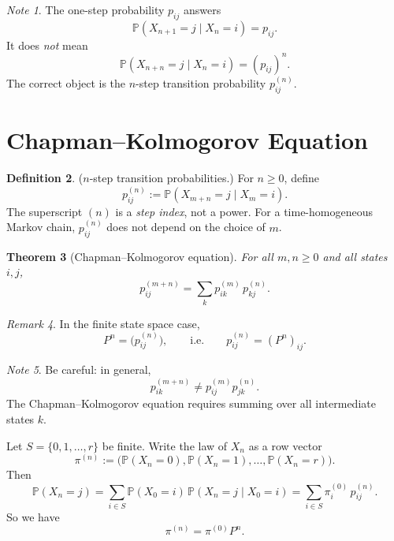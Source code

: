 \documentclass[11pt]{article}
\theoremstyle{plain}
\newtheorem{theorem}{Theorem}[section]
\theoremstyle{definition}
\newtheorem{definition}[theorem]{Definition}
\theoremstyle{remark}
\newtheorem{remark}[theorem]{Remark}
\newtheorem{note}[theorem]{Note}
\begin{document}
	\begin{note}
		The one-step probability \(p_{ij}\) answers
		\[
		\mathbb{P}(X_{n+1}=j\mid X_n=i)=p_{ij}.
		\]
		It does \emph{not} mean
		\[
		\mathbb{P}(X_{n+n}=j\mid X_n=i)=(p_{ij})^n.
		\]
		The correct object is the \(n\)-step transition probability \(p_{ij}^{(n)}\).
	\end{note}
	
	\section{Chapman--Kolmogorov Equation}
	
	\begin{definition}
		(\(n\)-step transition probabilities.)
		For \(n\ge 0\), define
		\[
		p_{ij}^{(n)}:=\mathbb{P}(X_{m+n}=j\mid X_m=i).
		\]
		The superscript \((n)\) is a \emph{step index}, not a power.
		For a time-homogeneous Markov chain, \(p_{ij}^{(n)}\) does not depend on the choice of \(m\).
	\end{definition}
	
	\begin{theorem}[Chapman--Kolmogorov equation]
		For all \(m,n\ge 0\) and all states \(i,j\),
		\[
		p_{ij}^{(m+n)}=\sum_{k} p_{ik}^{(m)}\,p_{kj}^{(n)}.
		\]
	\end{theorem}
	
	\begin{remark}
		In the finite state space case,
		\[
		P^n=\bigl(p_{ij}^{(n)}\bigr),
		\qquad\text{i.e.}\qquad
		p_{ij}^{(n)}=(P^n)_{ij}.
		\]
	\end{remark}
	
	\begin{note}
		Be careful: in general,
		\[
		p_{ik}^{(m+n)}\neq p_{ij}^{(m)}p_{jk}^{(n)}.
		\]
		The Chapman--Kolmogorov equation requires summing over all intermediate states \(k\).
	\end{note}
	
	
	Let \(S=\{0,1,\dots,r\}\) be finite. Write the law of \(X_n\) as a row vector
	\[
	\pi^{(n)}:=\bigl(\mathbb{P}(X_n=0),\mathbb{P}(X_n=1),\dots,\mathbb{P}(X_n=r)\bigr).
	\]
	Then
	\[
	\mathbb{P}(X_n = j)
	= \sum_{i \in S} \mathbb{P}(X_0 = i)\,\mathbb{P}(X_n = j \mid X_0 = i)
	= \sum_{i \in S} \pi_i^{(0)}\, p_{ij}^{(n)}.
	\]
	So we have 
	\[
	\pi^{(n)}=\pi^{(0)}P^n.
	\]
	
\end{document}
